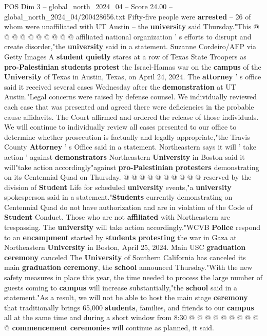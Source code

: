 \begin{textsample}{POS Dim 3 – global\_north\_2024\_04 – Score 24.00 – global\_north\_2024\_04/200428656.txt}
Fifty-five people were \textbf{arrested} -- 26 of whom were unaffiliated with UT Austin -- the \textbf{university} said Thursday."This @ @ @ @ @ @ @ @ @ @ affiliated national organization ' s efforts to disrupt and create disorder,"the \textbf{university} said in a statement.
Suzanne Cordeiro/AFP via Getty Images A \textbf{student} \textbf{quietly} stares at a row of Texas State Troopers as \textbf{pro-Palestinian} \textbf{students} \textbf{protest} the Israel-Hamas war on the \textbf{campus} of the \textbf{University} of Texas in Austin, Texas, on April 24, 2024.
The \textbf{attorney} ' s office said it received several cases Wednesday after the \textbf{demonstration} at UT Austin."Legal concerns were raised by defense counsel.
We individually reviewed each case that was presented and agreed there were deficiencies in the probable cause affidavits.
The Court affirmed and ordered the release of those individuals.
We will continue to individually review all cases presented to our office to determine whether prosecution is factually and legally appropriate,"the Travis County \textbf{Attorney} ' s Office said in a statement.
Northeastern says it will ' take action ' against \textbf{demonstrators} Northeastern \textbf{University} in Boston said it will"take action accordingly"against \textbf{pro-Palestinian} \textbf{protesters} demonstrating on its Centennial Quad on Thursday. @ @ @ @ @ @ @ @ @ @ reserved by the division of \textbf{Student} Life for scheduled \textbf{university} events,"a \textbf{university} spokesperson said in a statement."\textbf{Students} currently demonstrating on Centennial Quad do not have authorization and are in violation of the Code of \textbf{Student} Conduct.
Those who are not \textbf{affiliated} with Northeastern are trespassing.
The \textbf{university} will take action accordingly."WCVB \textbf{Police} respond to an \textbf{encampment} started by \textbf{students} \textbf{protesting} the war in Gaza at Northeastern \textbf{University} in Boston, April 25, 2024.
Main USC \textbf{graduation} \textbf{ceremony} canceled The \textbf{University} of Southern California has canceled its main \textbf{graduation} \textbf{ceremony}, the \textbf{school} announced Thursday."With the new safety measures in place this year, the time needed to process the large number of guests coming to \textbf{campus} will increase substantially,"the \textbf{school} said in a statement."As a result, we will not be able to host the main stage \textbf{ceremony} that traditionally brings 65,000 \textbf{students}, families, and friends to our \textbf{campus} all at the same time and during a short window from 8:30 @ @ @ @ @ @ @ @ @ @ \textbf{commencement} \textbf{ceremonies} will continue as planned, it said.

\end{textsample}
